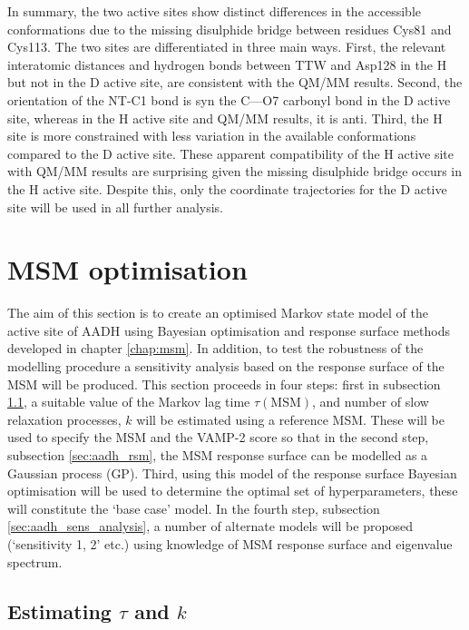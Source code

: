 In summary, the two active sites show distinct differences in the accessible conformations due to the missing disulphide bridge between residues Cys81 and Cys113. The two sites are differentiated in three main ways. First, the relevant interatomic distances and hydrogen bonds between TTW and Asp128 in the H but not in the D active site, are consistent with the QM/MM results. Second, the orientation of the NT-C1 bond is syn the C---O7 carbonyl bond in the D active site, whereas in the H active site and QM/MM results, it is anti. Third, the H site is more constrained with less variation in the available conformations compared to the  D active site. These apparent compatibility of the H active site with QM/MM results are surprising given the missing disulphide bridge occurs in the H active site. Despite this, only the  coordinate trajectories for the D active site will be used in all further analysis.  

\section{MSM optimisation}\label{sec:aadh_optimisation}

The aim of this section is to create an optimised Markov state model of the active site of AADH using Bayesian optimisation and response surface methods developed in chapter \ref{chap:msm}. In addition, to test the robustness of the modelling procedure a sensitivity analysis based on the response surface of the MSM will be produced. This section proceeds in four steps: first in subsection \ref{sec:aadh_est_tau_k}, a suitable  value of the Markov lag time $\tau(\mathrm{MSM})$, and number of slow relaxation processes, $k$ will be estimated using a reference MSM. These will be used to specify the MSM and the VAMP-2 score so that in the second step, subsection \ref{sec:aadh_rsm},  the MSM response surface can be modelled as a Gaussian process (GP). Third, using this model of the response surface Bayesian optimisation will be used to determine the optimal set of hyperparameters, these will constitute the `base case' model.  In the fourth step, subsection \ref{sec:aadh_sens_analysis}, a number of alternate models will be proposed (`sensitivity 1, 2' etc.)  using knowledge of MSM response surface and eigenvalue spectrum.  

\subsection{Estimating $\tau$ and $k$}\label{sec:aadh_est_tau_k}

